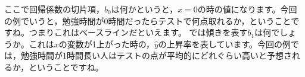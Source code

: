 \documentclass{ltjbook}
\begin{document}
ここで回帰係数の切片項，$b_0$は何かというと，$x=0$の時の値になります。今回の例でいうと，勉強時間が0時間だったらテストで何点取れるか，ということですね。つまりこれはベースラインだといえます。
では傾きを表す$b_1$は何でしょうか。これは$x$の変数が1上がった時の，$\hat{y}$の上昇率を表しています。今回の例では，勉強時間が1時間長い人はテストの点が平均的にどれぐらい高いと予想されるか，ということですね。


\end{document}
